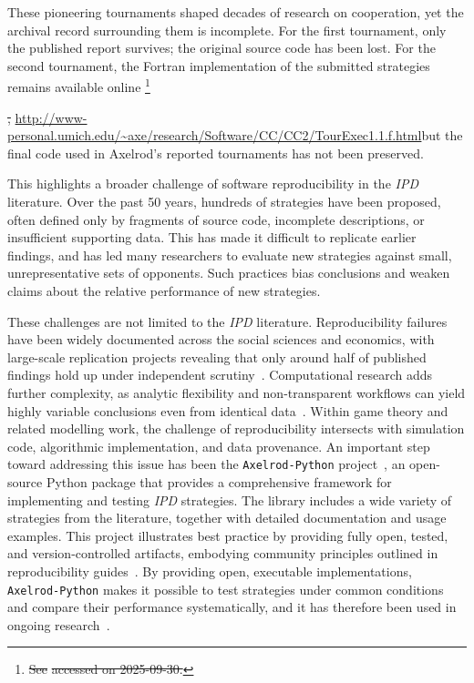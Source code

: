 \documentclass{article}
\newcommand{\IPD}{\emph{IPD}}
\newcommand{\AXL}{\texttt{Axelrod-Python}}
\providecommand{\DIFaddtex}[1]{{\protect\color{blue}\uwave{#1}}} %
\providecommand{\DIFdeltex}[1]{{\protect\color{red}\sout{#1}}}                      %
\providecommand{\DIFaddbegin}{} %
\providecommand{\DIFaddend}{} %
\providecommand{\DIFdelbegin}{} %
\providecommand{\DIFdelend}{} %
\providecommand{\DIFadd}[1]{\texorpdfstring{\DIFaddtex{#1}}{#1}} %
\providecommand{\DIFdel}[1]{\texorpdfstring{\DIFdeltex{#1}}{}} %
\newcommand{\DIFscaledelfig}{0.5}
\newlength{\DIFdelgraphicswidth} %
\newlength{\DIFdelgraphicsheight} %
\newcommand{\DIFaddincludegraphics}[2][]{{\color{blue}\fbox{\DIFOincludegraphics[#1]{#2}}}} %
\newcommand{\DIFdelincludegraphics}[2][]{%
\sbox{\DIFdelgraphicsbox}{\DIFOincludegraphics[#1]{#2}}%
\settoboxwidth{\DIFdelgraphicswidth}{\DIFdelgraphicsbox} %
\settoboxtotalheight{\DIFdelgraphicsheight}{\DIFdelgraphicsbox} %
\scalebox{\DIFscaledelfig}{%
\parbox[b]{\DIFdelgraphicswidth}{\usebox{\DIFdelgraphicsbox}\\[-\baselineskip] \rule{\DIFdelgraphicswidth}{0em}}\llap{\resizebox{\DIFdelgraphicswidth}{\DIFdelgraphicsheight}{%
\setlength{\unitlength}{\DIFdelgraphicswidth}%
\begin{picture}(1,1)%
\thicklines\linethickness{2pt} %
{\color[rgb]{1,0,0}\put(0,0){\framebox(1,1){}}}%
{\color[rgb]{1,0,0}\put(0,0){\line( 1,1){1}}}%
{\color[rgb]{1,0,0}\put(0,1){\line(1,-1){1}}}%
\end{picture}%
}\hspace*{3pt}}} %
} %
\DeclareRobustCommand{\DIFaddbegin}{\DIFOaddbegin \let\includegraphics\DIFaddincludegraphics} %
\DeclareRobustCommand{\DIFaddend}{\DIFOaddend \let\includegraphics\DIFOincludegraphics} %
\DeclareRobustCommand{\DIFdelbegin}{\DIFOdelbegin \let\includegraphics\DIFdelincludegraphics} %
\DeclareRobustCommand{\DIFdelend}{\DIFOaddend \let\includegraphics\DIFOincludegraphics} %
\begin{document}
These pioneering tournaments shaped decades of research on cooperation, yet the
archival record surrounding them is incomplete. For the first tournament, only
the published report survives; the original source code has been lost. For the
second tournament, the Fortran implementation of the submitted strategies
remains available online \DIFdelbegin \footnote{\DIFdel{See
}%
\DIFdel{accessed on 2025-09-30.}}%
\addtocounter{footnote}{-1}%
\DIFdel{,
}\DIFdelend \DIFaddbegin \DIFadd{(see
}\url{http://www-personal.umich.edu/~axe/research/Software/CC/CC2/TourExec1.1.f.html}\DIFadd{,
accessed on 2025-09-30),
}\DIFaddend but the final code used in Axelrod's reported tournaments has not been preserved.

This highlights a broader challenge of software reproducibility in
the \IPD{} literature. Over the past 50 years, hundreds of strategies have been
proposed, often defined only by fragments of source code, incomplete
descriptions, or insufficient supporting data. This has made it difficult to
replicate earlier findings, and has led many researchers to evaluate new
strategies against small, unrepresentative sets of opponents. Such practices
bias conclusions and weaken claims about the relative performance of new
strategies.

These challenges are not limited to the \IPD{} literature.
Reproducibility failures have been widely documented across the social sciences
and economics, with large-scale replication projects revealing that only around
half of published findings hold up under independent
scrutiny~\cite{open_science_collaboration2015, camerer2016, camerer2018}. Computational
research adds further complexity, as analytic flexibility and non-transparent
workflows can yield highly variable conclusions even from identical 
data~\cite{silberzahn2018, breznau2022}. Within game theory and related modelling work,
the challenge of reproducibility intersects with simulation code, algorithmic
implementation, and data provenance. 
An important step toward addressing this issue has been the
\texttt{Axelrod-Python} project~\cite{AxelrodProject}, an open-source Python
package that provides a comprehensive framework for implementing and testing
\IPD{} strategies. The library includes a wide variety of strategies from the
literature, together with detailed documentation and usage examples. 
This project illustrates best practice by providing fully open, tested, and version-controlled
artifacts, embodying community principles outlined in reproducibility 
guides~\cite{wilson2014, sandve2013, wilson2017, stodden2018, turingway2022}.
By
providing open, executable implementations, \AXL{} makes it possible to test
strategies under common conditions and compare their performance systematically,
and it has therefore been used in ongoing research~\cite{Harper2017,
Knight2017, glynatsi2024properties, bucciarelli2024studying, macmillan2024game}.
\end{document}
